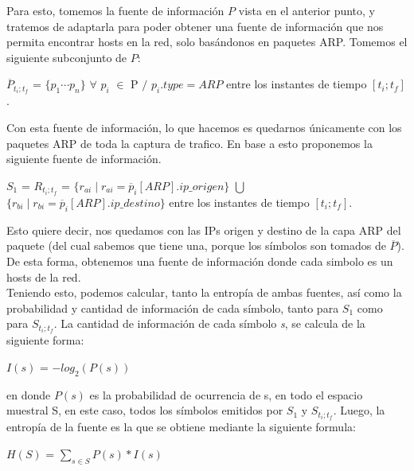 Para esto, tomemos la fuente de información $P$ vista en el anterior punto, y tratemos de adaptarla para poder obtener una fuente de información que nos permita encontrar hosts en la red, solo basándonos en paquetes ARP.
Tomemos el siguiente subconjunto de $P$: 

\begin{center}
	$\overline{P}_{t_i;t_f}$ = $\{p_1 \dotsb p_n\}$ $\forall$ $p_i$ $\in$ P $/$ $p_i.type = ARP$ entre los instantes de tiempo $[t_i; t_f ]$.
\end{center}

Con esta fuente de información, lo que hacemos es quedarnos únicamente con los paquetes ARP de toda la captura de trafico. En base a esto proponemos la siguiente fuente de información.

\begin{center}
	$S_1$ = $R_{t_i;t_f}$ = $\{r_{ai} \mid r_{ai} = \overline{p}_i[ARP].ip\_origen \}$ $\bigcup$ $\{r_{bi} \mid r_{bi} = \overline{p}_i[ARP].ip\_destino \}$ entre los instantes de tiempo $[t_i; t_f ]$.
\end{center}

Esto quiere decir, nos quedamos con las IPs origen y destino de la capa ARP del paquete (del cual sabemos que tiene una, porque los símbolos son tomados de $\overline{P}$). De esta forma, obtenemos una fuente de información donde cada simbolo es un hosts de la red. \\

Teniendo esto, podemos calcular, tanto la entropía de ambas fuentes, así como la probabilidad y cantidad de información de cada símbolo, tanto para $S_1$ como para $S_{t_i;t_f}$. La cantidad de información de cada símbolo \textit{s}, se calcula de la siguiente forma:

\begin{center}
	$I(s)$ = $-log_2(P(s))$
\end{center}

en donde $P(s)$ es la probabilidad de ocurrencia de s, en todo el espacio muestral S, en este caso, todos los símbolos emitidos por $S_1$ y $S_{t_i;t_f}$. Luego, la entropía de la fuente es la que se obtiene mediante la siguiente formula:

\begin{center}
	$H(S)$ = $\sum_{s \in S} P(s)*I(s)$
\end{center}



